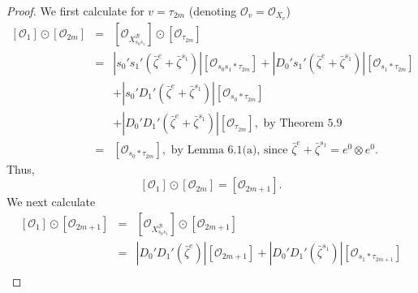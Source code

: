 \documentclass[10pt,a4paper]{amsart}
\def\B{\mathcal{B}}
\def\ref#1{#1}
\newcommand{\X}{mathcal{X}}
\begin{document}

\begin{proof}
We first calculate for $v=\tau_{2m}$ (denoting $\mathcal{O}_v=\mathcal{O}_{X_v}$)
\begin{eqnarray*}
\left[ \mathcal{O}_{1}\right] \odot \left[ \mathcal{O}_{2m}\right]&=& \left[ \mathcal{O}_{X_{s_0s_1}^\B}\right] \odot \left[ \mathcal{O}_{\tau_{2m}}\right]\\
&=& \left\vert s_0's_1'\left( \bar{\zeta}^e+\bar{\zeta}^{s_1}\right) \right\vert \left[\mathcal{O}_{s_0s_1*\tau_{2m}}\right]
+ \left\vert D_0's_1' \left(\bar{\zeta}^e+\bar{\zeta}^{s_1}\right) \right\vert \left[\mathcal{O}_{s_1*\tau_{2m}}\right]\\
&&+ \left\vert s_0'D_1' \left(\bar{\zeta}^e+\bar{\zeta}^{s_1}\right) \right\vert \left[\mathcal{O}_{s_0*\tau_{2m}}\right]\\
&&+ \left\vert D_0'D_1' \left(\bar{\zeta}^e+\bar{\zeta}^{s_1}\right) \right\vert \left[\mathcal{O}_{\tau_{2m}}\right],\mbox{ by Theorem \ref{5.9}}\\
&=&  \left[\mathcal{O}_{s_0*\tau_{2m}}\right],\mbox{ by Lemma \ref{6.1}(a), since } \bar{\zeta}^e+\bar{\zeta}^{s_1}= e^0\otimes e^0. 
\end{eqnarray*}
Thus, 
\begin{equation}\label{6.3.1}
\left[ \mathcal{O}_{1}\right] \odot \left[ \mathcal{O}_{2m}\right] = \left[ \mathcal{O}_{2m+1}\right].
\end{equation}
We next calculate  
\begin{eqnarray*}
\left[ \mathcal{O}_{1}\right] \odot \left[ \mathcal{O}_{2m+1}\right] &=& \left[ \mathcal{O}_{X_{s_0s_1}^\B}\right] \odot \left[ \mathcal{O}_{2m+1}\right] \\
&=&  \left\vert D_0'D_1' \left(\bar{\zeta}^e\right) \right\vert \left[\mathcal{O}_{2m+1}\right]+  \left\vert D_0'D_1' \left(\bar{\zeta}^{s_1}\right) \right\vert \left[\mathcal{O}_{s_1*\tau_{2m+1}}\right]\\

\end{eqnarray*}
\end{proof}
\end{document}
